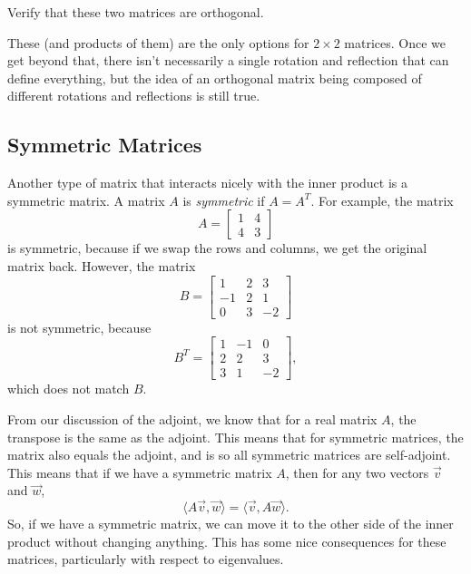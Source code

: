 \documentclass{ximera}
\begin{document}
\begin{exercise}
Verify that these two matrices are orthogonal.
\end{exercise} 

These (and products of them) are the only options for $2\times 2$ matrices. Once we get beyond that, there isn't necessarily a single rotation and reflection that can define everything, but the idea of an orthogonal matrix being composed of different rotations and reflections is still true.

\subsection{Symmetric Matrices}

Another type of matrix that interacts nicely with the inner product is a symmetric matrix. A matrix $A$ is \emph{symmetric} if $A = A^T$. For example, the matrix
\[ 
    A = 
    \begin{bmatrix} 
        1 & 4 \\ 
        4 & 3 
    \end{bmatrix} 
\] 
is symmetric, because if we swap the rows and columns, we get the original matrix back. However, the matrix
\[ 
    B = 
    \begin{bmatrix} 
        1 & 2 & 3 \\ 
        -1 & 2 & 1 \\ 
        0 & 3 & -2 
    \end{bmatrix} 
\] 
is not symmetric, because
\[ 
    B^T = 
    \begin{bmatrix} 
        1 & -1 & 0 \\ 
        2 & 2 & 3 \\ 
        3 & 1 & -2 
    \end{bmatrix}, 
\] 
which does not match $B$. 

From our discussion of the adjoint, we know that for a real matrix $A$, the transpose is the same as the adjoint. This means that for symmetric matrices, the matrix also equals the adjoint, and is so all symmetric matrices are self-adjoint. This means that if we have a symmetric matrix $A$, then for any two vectors $\vec{v}$ and $\vec{w}$, 
\[ 
    \langle A\vec{v}, \vec{w} \rangle = \langle \vec{v}, A \vec{w} \rangle. 
\] 
So, if we have a symmetric matrix, we can move it to the other side of the inner product without changing anything. This has some nice consequences for these matrices, particularly with respect to eigenvalues.
\end{document}
